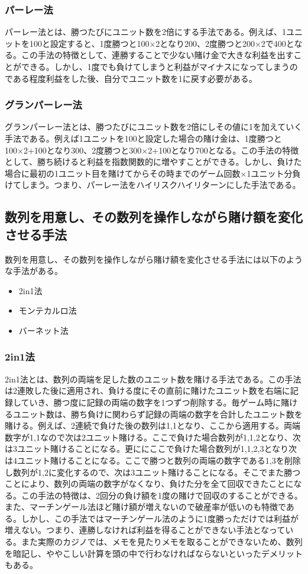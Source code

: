 \subsubsection{パーレー法}
パーレー法とは、勝つたびにユニット数を2倍にする手法である。例えば、1ユニットを100と設定すると、1度勝つと100×2となり200、2度勝つと200×2で400となる。この手法の特徴として、連勝することで少ない賭け金で大きな利益を出すことができる。しかし、1度でも負けてしまうと利益がマイナスになってしまうのである程度利益をした後、自分でユニット数を1に戻す必要がある。
\subsubsection{グランパーレー法}
グランパーレー法とは、勝つたびにユニット数を2倍にしその値に1を加えていく手法である。例えば1ユニットを100と設定した場合の賭け金は、1度勝つと100×2+100となり300、2度勝つと300×2+100となり700となる。この手法の特徴として、勝ち続けると利益を指数関数的に増やすことができる。しかし、負けた場合に最初の1ユニット目を賭けてからその時までのゲーム回数×1ユニット分負けてしまう。つまり、パーレー法をハイリスクハイリターンにした手法である。

\subsection{数列を用意し、その数列を操作しながら賭け額を変化させる手法}
 数列を用意し、その数列を操作しながら賭け額を変化させる手法には以下のような手法がある。
\begin{itemize}
 \item 2in1法
 \item モンテカルロ法
 \item バーネット法
\end{itemize}
\subsubsection{2in1法}
2in1法とは、数列の両端を足した数のユニット数を賭ける手法である。この手法は2連敗した後に適用され、負ける度にその直前に賭けたユニット数を右端に記録していき、勝つ度に記録の両端の数字を1つずつ削除する。毎ゲーム時に賭けるユニット数は、勝ち負けに関わらず記録の両端の数字を合計したユニット数を賭ける。例えば、2連続で負けた後の数列は1,1となり、ここから適用する。両端数字が1,1なので次は2ユニット賭ける。ここで負けた場合数列が1,1,2となり、次は3ユニット賭けることになる。更ににここで負けた場合数列が1,1,2,3となり次は4ユニット賭けることになる。ここで勝つと数列の両端の数字である1,3を削除し数列が1,2に変化するので、次は3ユニット賭けることになる。そこでまた勝つことにより、数列の両端の数字がなくなり、負けた分を全て回収できたことになる。この手法の特徴は、2回分の負け額を1度の賭けで回収のすることができる。また、マーチンゲール法ほど賭け額が増えないので破産率が低いのも特徴である。しかし、この手法ではマーチンゲール法のように1度勝っただけでは利益が増えない。つまり、連勝しなければ利益を得ることができない手法となっている。また実際のカジノでは、メモを見たりメモを取ることができないため、数列を暗記し、ややこしい計算を頭の中で行わなければならないといったデメリットもある。
